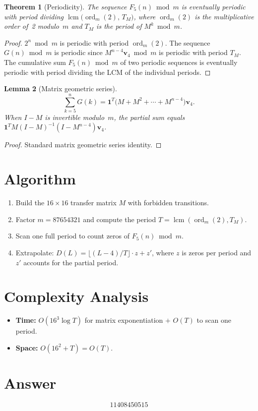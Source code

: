 \documentclass[12pt]{article}
\newtheorem{theorem}{Theorem}
\newtheorem{lemma}[theorem]{Lemma}
\begin{document}
\begin{theorem}[Periodicity]
The sequence $F_5(n)\bmod m$ is eventually periodic with period dividing $\operatorname{lcm}\bigl(\operatorname{ord}_m(2),\,T_M\bigr)$, where $\operatorname{ord}_m(2)$ is the multiplicative order of~2 modulo~$m$ and $T_M$ is the period of $M^k\bmod m$.
\end{theorem}

\begin{proof}
$2^n\bmod m$ is periodic with period $\operatorname{ord}_m(2)$. The sequence $G(n)\bmod m$ is periodic since $M^{n-4}\mathbf{v}_4\bmod m$ is periodic with period $T_M$. The cumulative sum $F_5(n)\bmod m$ of two periodic sequences is eventually periodic with period dividing the LCM of the individual periods.
\end{proof}

\begin{lemma}[Matrix geometric series]
\[
\sum_{k=5}^n G(k) = \mathbf{1}^T\bigl(M + M^2 + \cdots + M^{n-4}\bigr)\mathbf{v}_4.
\]
When $I-M$ is invertible modulo~$m$, the partial sum equals $\mathbf{1}^T M(I-M)^{-1}(I-M^{n-4})\mathbf{v}_4$.
\end{lemma}

\begin{proof}
Standard matrix geometric series identity.
\end{proof}

\section{Algorithm}
\begin{enumerate}
\item Build the $16\times 16$ transfer matrix $M$ with forbidden transitions.
\item Factor $m = 87654321$ and compute the period $T = \operatorname{lcm}(\operatorname{ord}_m(2), T_M)$.
\item Scan one full period to count zeros of $F_5(n)\bmod m$.
\item Extrapolate: $D(L) = \lfloor(L-4)/T\rfloor\cdot z + z'$, where $z$ is zeros per period and $z'$ accounts for the partial period.
\end{enumerate}

\section{Complexity Analysis}
\begin{itemize}
\item \textbf{Time:} $O(16^3\log T)$ for matrix exponentiation $+$ $O(T)$ to scan one period.
\item \textbf{Space:} $O(16^2 + T) = O(T)$.
\end{itemize}

\section{Answer}

\[
\boxed{11408450515}
\]
\end{document}
